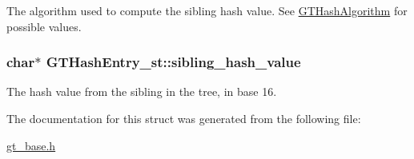 \label{struct_g_t_hash_entry__st_a3c427767bec4dcd42f94cdd31f15663f}
The algorithm used to compute the sibling hash value. See \hyperlink{group__common_ga5110e02245c37b4ff48ea4c4efb2924a}{GTHashAlgorithm} for possible values. \hypertarget{struct_g_t_hash_entry__st_ac3ad24df0b919ae386765db7250f29db}{
\subsubsection[{sibling\_\-hash\_\-value}]{\setlength{\rightskip}{0pt plus 5cm}char$\ast$ {\bf GTHashEntry\_\-st::sibling\_\-hash\_\-value}}}
\label{struct_g_t_hash_entry__st_ac3ad24df0b919ae386765db7250f29db}
The hash value from the sibling in the tree, in base 16. 

The documentation for this struct was generated from the following file:\begin{DoxyCompactItemize}
\item 
\hyperlink{gt__base_8h}{gt\_\-base.h}\end{DoxyCompactItemize}

